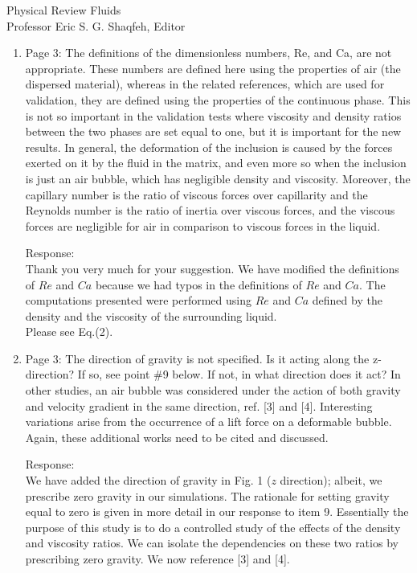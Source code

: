 \documentclass{letter}
\begin{document}
\begin{letter}{
Physical Review Fluids\\
Professor Eric S. G. Shaqfeh, Editor\\}
\begin{enumerate}
\par\noindent
\item
\textsf
{Page 3: The definitions of the dimensionless numbers, Re, and Ca, are not
appropriate.  These numbers are defined here using the properties of air (the
dispersed material), whereas in the related references, which are used for
validation, they are defined using the properties of the continuous phase.
This is not so important in the validation tests where viscosity and density
ratios between the two phases are set equal to one, but it is important for the
new results. In general, the deformation of the inclusion is caused by the
forces exerted on it by the fluid in the matrix, and even more so when the
inclusion is just an air bubble, which has negligible density and viscosity.
Moreover, the capillary number is the ratio of viscous forces over capillarity
and the Reynolds number is the ratio of inertia over viscous forces, and the
viscous forces are negligible for air in comparison to viscous forces in the
liquid.}
\vspace{3 mm}

Response: \\
Thank you very much for your suggestion.  We have modified the definitions of
$Re$ and $Ca$ because we had typos in the definitions of $Re$ and $Ca$.  The
computations presented were performed using $Re$ and $Ca$ defined by the
density and the viscosity of the surrounding liquid.
\\
Please see Eq.(2).
\\

\par\noindent
\item
\textsf
{Page 3: The direction of gravity is not specified. Is it acting along the
z-direction? If so, see point \#9 below.  If not, in what direction does it
act? In other studies, an air bubble was considered under the action of both
gravity and velocity gradient in the same direction, ref. [3] and [4].
Interesting variations arise from the occurrence of a lift force on a
deformable bubble. Again, these additional works need to be cited and
discussed.}
\vspace{3 mm}

Response: \\
We have added the direction of gravity in Fig. 1 ($z$ direction);
albeit, we prescribe zero gravity in our simulations.  The rationale
for setting gravity equal to zero is given in more detail in our response
to item 9.  Essentially the purpose of this study is to do a controlled
study of the effects of the density and viscosity ratios.  We can isolate
the dependencies on these two ratios by prescribing zero gravity.  We now
reference [3] and [4].
\\


\end{enumerate}
\end{letter}
\end{document}
